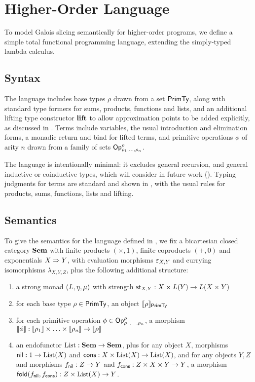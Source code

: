 \section{Higher-Order Language}
\label{sec:language}

To model Galois slicing semantically for higher-order programs, we define a simple total functional
programming language, extending the simply-typed lambda calculus.

\subsection{Syntax}
\label{sec:language:syntax}

The language includes base types $\rho$ drawn from a set $\mathsf{PrimTy}$, along with standard type formers for sums,
products, functions and lists, and an additional lifting type constructor $\mathbf{lift}$ to allow approximation
points to be added explicitly, as discussed in . Terms include variables, the
usual introduction and elimination forms, a monadic return and bind for lifted terms, and primitive operations
$\phi$ of arity $n$ drawn from a family of sets $\mathsf{Op}^\rho_{\rho_1,\ldots,\rho_n}$.

The language is intentionally minimal: it excludes general recursion, and general inductive or coinductive
types, which will consider in future work (). Typing judgments for terms are standard and
shown in , with the usual rules for products, sums, functions, lists and lifting.




\subsection{Semantics}
\label{sec:language:semantics}



To give the semantics for the language defined in , we fix a bicartesian closed
category $\mathbf{Sem}$ with finite products $(\times, 1)$, finite coproducts $(+, 0)$ and exponentials
$X \Rightarrow Y$, with evaluation morphisms $\varepsilon_{X,Y}$ and currying isomorphisms $\lambda_{X,Y,Z}$,
plus the following additional structure:
\begin{enumerate}
\item a strong monad $(L, \eta, \mu)$ with strength $\mathsf{st}_{X,Y}: X \times L(Y) \to L(X
\times Y)$
\item for each base type $\rho \in \mathsf{PrimTy}$, an object $\llbracket \rho \rrbracket_{\mathsf{PrimTy}}$
\item for each primitive operation $\phi \in \mathsf{Op}^\rho_{\rho_1,\ldots,\rho_n}$, a morphism $\llbracket \phi \rrbracket:
\llbracket \rho_1 \rrbracket \times \ldots \times \llbracket \rho_n \rrbracket \to \llbracket \rho \rrbracket$
\item an endofunctor $\mathrm{List}: \mathbf{Sem} \to \mathbf{Sem}$, plus for any object $X$, morphisms $\mathsf{nil}: 1 \to \mathrm{List}(X)$ and
$\mathsf{cons}: X \times \mathrm{List}(X) \to \mathrm{List}(X)$, and for any objects $Y, Z$ and morphisms $f_{\mathsf{nil}}: Z \to Y$ and
$f_{\mathsf{cons}}: Z \times X \times Y \to Y$, a morphism $\mathsf{fold}(f_{\mathsf{nil}},f_{\mathsf{cons}}): Z \times \mathrm{List}(X) \to Y$.
\end{enumerate}

